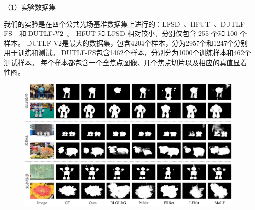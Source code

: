 （1）实验数据集
%
%
\par
%
%
我们的实验是在四个公共光场基准数据集上进行的：LFSD~\cite{li2014saliency}、HFUT~\cite{zhang2017saliency}、DUTLF-FS~\cite{zhang2019memory}~和 DUTLF-V2~\cite{piao2020dut}。 HFUT 和 LFSD 相对较小，分别仅包含 255 个和 100 个样本。 DUTLF-V2是最大的数据集，包含4204个样本，分为2957个和1247个分别用于训练和测试。 DUTLF-FS包含1462个样本，分别分为1000个训练样本和462个测试样本。 每个样本都包含一个全焦点图像、几个焦点切片以及相应的真值显着性图。
%
%
%
%
\par
%
%
%
\begin{figure}[!ht]
	\centering
	\includegraphics[width=\linewidth]{figures/chapter3/compare_1}
	\label{figure:figure_comparison_1}
\end{figure}






